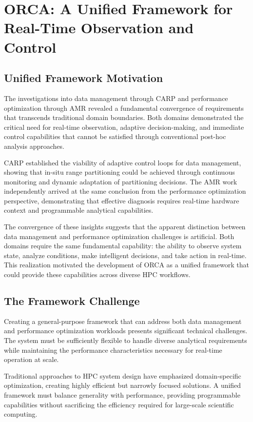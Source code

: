 \newpage
\chapter{ORCA: A Unified Framework for Real-Time Observation and Control}

\section{Unified Framework Motivation}

The investigations into data management through CARP and performance optimization through AMR
revealed a fundamental convergence of requirements that transcends traditional domain boundaries.
Both domains demonstrated the critical need for real-time observation, adaptive decision-making,
and immediate control capabilities that cannot be satisfied through conventional post-hoc analysis
approaches.

CARP established the viability of adaptive control loops for data management, showing that
in-situ range partitioning could be achieved through continuous monitoring and dynamic adaptation
of partitioning decisions.
The AMR work independently arrived at the same conclusion from the performance optimization
perspective, demonstrating that effective diagnosis requires real-time hardware context and
programmable analytical capabilities.

The convergence of these insights suggests that the apparent distinction between data management
and performance optimization challenges is artificial.
Both domains require the same fundamental capability: the ability to observe system state,
analyze conditions, make intelligent decisions, and take action in real-time.
This realization motivated the development of ORCA as a unified framework that could provide
these capabilities across diverse HPC workflows.

\section{The Framework Challenge}

Creating a general-purpose framework that can address both data management and performance
optimization workloads presents significant technical challenges.
The system must be sufficiently flexible to handle diverse analytical requirements while
maintaining the performance characteristics necessary for real-time operation at scale.

Traditional approaches to HPC system design have emphasized domain-specific optimization, creating
highly efficient but narrowly focused solutions.
A unified framework must balance generality with performance, providing programmable capabilities
without sacrificing the efficiency required for large-scale scientific computing.

